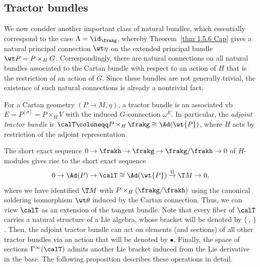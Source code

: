 \subsection{Tractor bundles}

We now consider another important class of natural bundles, which essentially correspond to the case $\Lambda=\id_\frakg$, whereby Theorem~\ref{thm 1.5.6 Cap} gives a natural principal connection $\wt\eta$ on the extended principal bundle $\wt P=P\times_H G$. Correspondingly, there are natural connections on all natural bundles associated to the Cartan bundle with respect to an action of $H$ that is the restriction of an action of $G$. Since these bundles are not generally trivial, the existence of such natural connections is already a nontrivial fact.

\begin{defn}
    For a Cartan geometry $(P\to M,\eta)$, a tractor bundle is an associated \gls{vb} $E=P^{[\sigma]}=P\times_H V$ with the induced $G$-connection $\omega^E$. In particular, the \emph{adjoint tractor bundle} is $\calT\coloneqq P\times_H \frakg\cong \Ad(\wt{P})$, where $H$ acts by restriction of the adjoint representation.
\end{defn}

The short exact sequence $0\to\frakh\to\frakg\to\frakg\slash\frakh\to 0$ of $H$-modules gives rise to the short exact sequence 
\[0\to\Ad(P)\to \calT\cong \Ad(\wt{P})\overset{\Pi}{\to} \T M\to 0,\]
where we have identified $\T M$ with $P\times_H (\frakg\slash\frakh)$ using the canonical soldering isomorphism $\wt\theta$ induced by the Cartan connection. Thus, we can view $\calT$ as an extension of the tangent bundle. Note that every fiber of $\calT$ carries a natural structure of a Lie algebra, whose bracket will be denoted by $\{\,,\,\}$. Then, the adjoint tractor bundle can act on elements (and sections) of all other tractor bundles via an action that will be denoted by $\bullet$. Finally, the space of sections $\Gamma^\infty(\calT)$ admits another Lie bracket induced from the Lie derivative in the base. The following proposition describes these operations in detail.

